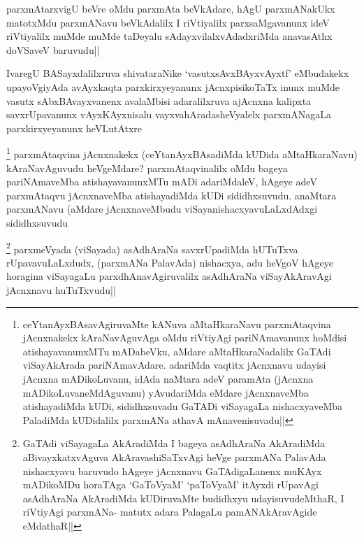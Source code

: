 
\begin{artha}
parxmAtarxvigU beVre oMdu parxmAta beVkAdare, hAgU parxmANakUkx matotxMdu parxmANavu beVkAdalilx I riVtiyalilx parxsaMgavanunx ideV riVtiyalilx muMde muMde taDeyalu sAdayxvilalxvAdadxriMda anavasAthx doVSaveV baruvudu||

IvaregU BASayxdalilxruva shivataraNike `vasutxsAvxBAyxvAyxtf' eMbudakekx upayoVgiyAda avAyxkaqta parxkirxyeyanunx jAcnxpisikoTaTx inunx muMde vasutx sAbxBAvayxvanenx avalaMbisi adaralilxruva ajAcnxna kalipxta savxrUpavanunx vAyxKAyxnisalu vayxvahAradasheVyalelx parxmANagaLa parxkirxyeyanunx heVLutAtxre
\end{artha}

\begin{artha}%
\footnote[1]{ceYtanAyxBAsavAgiruvaMte kANuva aMtaHkaraNavu parxmAtaqvina jAcnxnakekx kAraNavAguvAga oMdu riVtiyAgi pariNAmavanunx hoMdisi atishayavanunxMTu mADabeVku, aMdare aMtaHkaraNadalilx GaTAdi viSayAkArada pariNAmavAdare. adariMda vaqtitx jAcnxnavu udayisi jAcnxna mADikoLuvanu, idAda naMtara adeV paramAta (jAcnxna mADikoLuvaneMdAguvanu) yAvudariMda eMdare jAcnxnaveMba atishayadiMda kUDi, sididhxsuvadu GaTADi viSayagaLa nishacxyaveMba PaladiMda kUDidalilx parxmANa athavA mAnavenisuvadu||} parxmAtaqvina jAcnxnakekx (ceYtanAyxBAsadiMda kUDida aMtaHkaraNavu) kAraNavAguvudu heVgeMdare? parxmAtaqvinalilx oMdu bageya pariNAmaveMba  atishayavanunxMTu mADi adariMdaleV, hAgeye adeV parxmAtaqvu jAcnxnaveMba atishayadiMda kUDi sididhxsuvudu. anaMtara parxmANavu (aMdare jAcnxnaveMbudu viSayanishacxyavuLaLxdAdxgi sididhxsuvudu
\end{artha}


\begin{artha}
\footnote[2]{GaTAdi viSayagaLa AkAradiMda I bageya asAdhAraNa AkAradiMda aBivayxkatxvAguva AkAravashiSaTxvAgi heVge parxmANa PalavAda nishacxyavu baruvudo hAgeye jAcnxnavu GaTAdigaLanenx muKAyx mADikoMDu horaTAga `GaToV\s yaM' `paToV\s yaM' itAyxdi rUpavAgi asAdhAraNa AkAradiMda kUDiruvaMte budidhxyu udayisuvudeMthaR, I riVtiyAgi parxmANa- matutx adara PalagaLu pamANAkAravAgide eMdathaR||} parxmeVyada (viSayada) asAdhAraNa savxrUpadiMda hUTuTxva rUpavavuLaLxdudx, (parxmANa PalavAda) nishacxya, adu heVgoV hAgeye horagina viSayagaLu parxdhAnavAgiruvalilx asAdhAraNa viSayAkAravAgi jAcnxnavu huTuTxvudu||
\end{artha}

